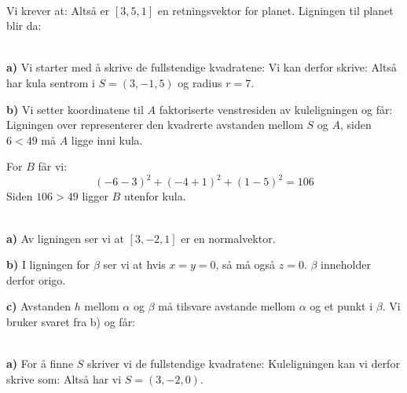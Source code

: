  \\
Vi krever at:\vs
{}
Altså er $ [3, 5, 1] $ en retningsvektor for planet. Ligningen til planet blir da:

 

\\
\textbf{a)} Vi starter med å skrive de fullstendige kvadratene:
Vi kan derfor skrive:
Altså har kula sentrom i $ S=(3, -1, 5) $ og radius $ r=7 $.

\textbf{b)} Vi setter koordinatene til $ A $ faktoriserte venstresiden av kuleligningen og får:
Ligningen over representerer den kvadrerte avstanden mellom $ S $ og $ A $, siden $ 6<49 $ må $ A $ ligge inni kula.

For $ B $ får vi:
\[ (-6-3)^2+(-4+1)^2 +(1-5)^2 = 106 \]
Siden $ 106>49 $ ligger $ B $ utenfor kula.

\\
\textbf{a)} Av ligningen ser vi at $ [3, -2, 1] $ er en normalvektor.

\textbf{b)} I ligningen for $ \beta $ ser vi at hvis $ x=y=0 $, så må også $ z=0 $. $ \beta $ inneholder derfor origo.

\textbf{c)} Avstanden $ h $ mellom $ \alpha $ og $ \beta $ må tilsvare avstande mellom $ \alpha $ og et punkt i $ \beta $. Vi bruker svaret fra b) og får:

\\
\textbf{a)} For å finne $ S $ skriver vi de fullstendige kvadratene:
Kuleligningen kan vi derfor skrive som:
Altså har vi $ S=(3, -2, 0) $.

